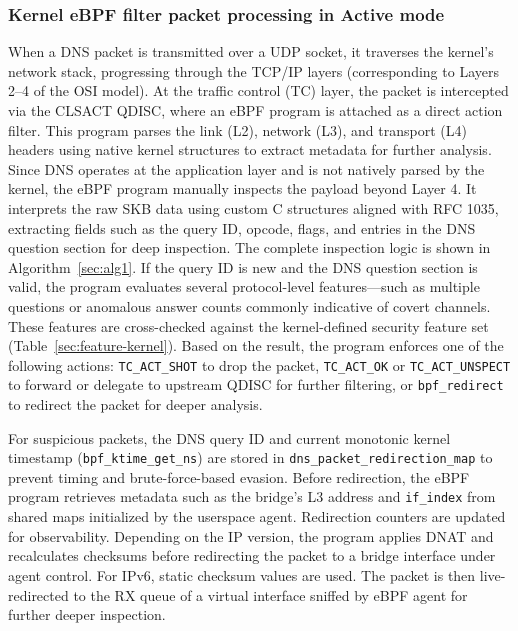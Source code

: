 \documentclass [11pt, proquest] {uwthesis}[2020/02/24]
\begin{document}
\subsubsection{Kernel eBPF filter packet processing in \textbf{Active} mode}
\label{active:sec1}
When a DNS packet is transmitted over a UDP socket, it traverses the kernel’s network stack, progressing through the TCP/IP layers (corresponding to Layers 2–4 of the OSI model). At the traffic control (TC) layer, the packet is intercepted via the CLSACT QDISC, where an eBPF program is attached as a direct action filter. This program parses the link (L2), network (L3), and transport (L4) headers using native kernel structures to extract metadata for further analysis. Since DNS operates at the application layer and is not natively parsed by the kernel, the eBPF program manually inspects the payload beyond Layer 4. It interprets the raw SKB data using custom C structures aligned with RFC 1035, extracting fields such as the query ID, opcode, flags, and entries in the DNS question section for deep inspection. The complete inspection logic is shown in Algorithm~\ref{sec:alg1}. 
If the query ID is new and the DNS question section is valid, the program evaluates several protocol-level features—such as multiple questions or anomalous answer counts commonly indicative of covert channels. These features are cross-checked against the kernel-defined security feature set (Table~\ref{sec:feature-kernel}). Based on the result, the program enforces one of the following actions: \texttt{TC\_ACT\_SHOT} to drop the packet, \texttt{TC\_ACT\_OK} or \texttt{TC\_ACT\_UNSPECT} to forward or delegate to upstream QDISC for further filtering, or \texttt{bpf\_redirect} to redirect the packet for deeper analysis.

For suspicious packets, the DNS query ID and current monotonic kernel timestamp (\texttt{bpf\_ktime\_get\_ns}) are stored in \texttt{dns\_packet\_redirection\_map} to prevent timing and brute-force-based evasion. Before redirection, the eBPF program retrieves metadata such as the bridge’s L3 address and \texttt{if\_index} from shared maps initialized by the userspace agent. Redirection counters are updated for observability. Depending on the IP version, the program applies DNAT and recalculates checksums before redirecting the packet to a bridge interface under agent control. For IPv6, static checksum values are used. The packet is then live-redirected to the RX queue of a virtual interface sniffed by eBPF agent for further deeper inspection.
\end{document}
